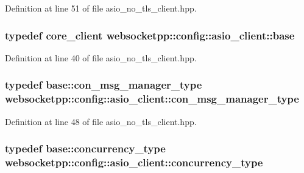 Definition at line 51 of file asio\+\_\+no\+\_\+tls\+\_\+client.\+hpp.

\hypertarget{structwebsocketpp_1_1config_1_1asio__client_adfbce2c3351334c0b83b8575cf48ac6f}{}
\subsubsection[{base}]{\setlength{\rightskip}{0pt plus 5cm}typedef {\bf core\+\_\+client} {\bf websocketpp\+::config\+::asio\+\_\+client\+::base}}\label{structwebsocketpp_1_1config_1_1asio__client_adfbce2c3351334c0b83b8575cf48ac6f}


Definition at line 40 of file asio\+\_\+no\+\_\+tls\+\_\+client.\+hpp.

\hypertarget{structwebsocketpp_1_1config_1_1asio__client_a428558a45b8df29fd19677bd1f302434}{}
\subsubsection[{con\+\_\+msg\+\_\+manager\+\_\+type}]{\setlength{\rightskip}{0pt plus 5cm}typedef {\bf base\+::con\+\_\+msg\+\_\+manager\+\_\+type} {\bf websocketpp\+::config\+::asio\+\_\+client\+::con\+\_\+msg\+\_\+manager\+\_\+type}}\label{structwebsocketpp_1_1config_1_1asio__client_a428558a45b8df29fd19677bd1f302434}


Definition at line 48 of file asio\+\_\+no\+\_\+tls\+\_\+client.\+hpp.

\hypertarget{structwebsocketpp_1_1config_1_1asio__client_a0443785a3a6e6f8d0f924fad4206b9a8}{}
\subsubsection[{concurrency\+\_\+type}]{\setlength{\rightskip}{0pt plus 5cm}typedef {\bf base\+::concurrency\+\_\+type} {\bf websocketpp\+::config\+::asio\+\_\+client\+::concurrency\+\_\+type}}\label{structwebsocketpp_1_1config_1_1asio__client_a0443785a3a6e6f8d0f924fad4206b9a8}


